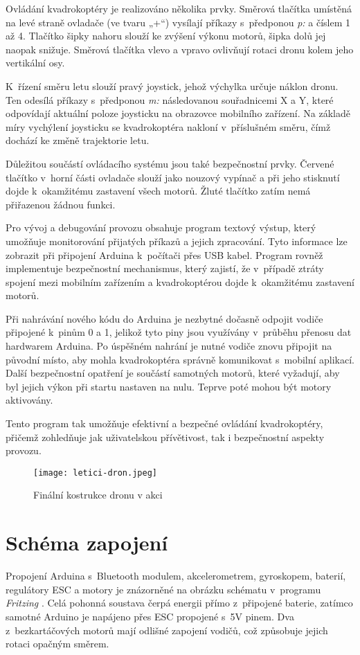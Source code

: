 \documentclass[12pt]{report}
\begin{document}
Ovládání kvadrokoptéry je realizováno několika prvky. Směrová tlačítka umístěná na levé straně ovladače (ve tvaru „+“) vysílají příkazy s~předponou \textit{p:} a číslem 1 až 4. Tlačítko šipky nahoru slouží ke zvýšení výkonu motorů, šipka dolů jej naopak snižuje. Směrová tlačítka vlevo a vpravo ovlivňují rotaci dronu kolem jeho vertikální osy.

K~řízení směru letu slouží pravý joystick, jehož výchylka určuje náklon dronu. Ten odesílá příkazy s~předponou \textit{m:} následovanou souřadnicemi X a Y, které odpovídají aktuální poloze joysticku na obrazovce mobilního zařízení. Na základě míry vychýlení joysticku se kvadrokoptéra nakloní v~příslušném směru, čímž dochází ke změně trajektorie letu.

Důležitou součástí ovládacího systému jsou také bezpečnostní prvky. Červené tlačítko v~horní části ovladače slouží jako nouzový vypínač a při jeho stisknutí dojde k~okamžitému zastavení všech motorů. Žluté tlačítko zatím nemá přiřazenou žádnou funkci.

Pro vývoj a debugování provozu obsahuje program textový výstup, který umožňuje monitorování přijatých příkazů a jejich zpracování. Tyto informace lze zobrazit při připojení Arduina k~počítači přes USB kabel. Program rovněž implementuje bezpečnostní mechanismus, který zajistí, že v~případě ztráty spojení mezi mobilním zařízením a kvadrokoptérou dojde k~okamžitému zastavení motorů.

Při nahrávání nového kódu do Arduina je nezbytné dočasně odpojit vodiče připojené k~pinům 0 a 1, jelikož tyto piny jsou využívány v~průběhu přenosu dat hardwarem Arduina. Po úspěšném nahrání je nutné vodiče znovu připojit na původní místo, aby mohla kvadrokoptéra správně komunikovat s~mobilní aplikací. Další bezpečnostní opatření je součástí samotných motorů, které vyžadují, aby byl jejich výkon při startu nastaven na nulu. Teprve poté mohou být motory aktivovány.

Tento program tak umožňuje efektivní a bezpečné ovládání kvadrokoptéry, přičemž zohledňuje jak uživatelskou přívětivost, tak i bezpečnostní aspekty provozu.

\begin{figure}[H]
	\centering
	\texttt{[image: letici-dron.jpeg]}
	\caption{Finální kostrukce dronu v akci}
	\label{fig:letici-dron.jpeg}
\end{figure}

\chapter[Schéma zapojení]{Schéma zapojení}
Propojení Arduina s~Bluetooth modulem, akcelerometrem, gyroskopem, baterií, regulátory ESC a motory je znázorněné na obrázku schématu v~programu \textit{Fritzing} \cite{fritzing}. Celá pohonná soustava čerpá energii přímo z~připojené baterie, zatímco samotné Arduino je napájeno přes ESC propojené s~5V pinem. Dva z~bezkartáčových motorů mají odlišné zapojení vodičů, což způsobuje jejich rotaci opačným směrem.
\end{document}
